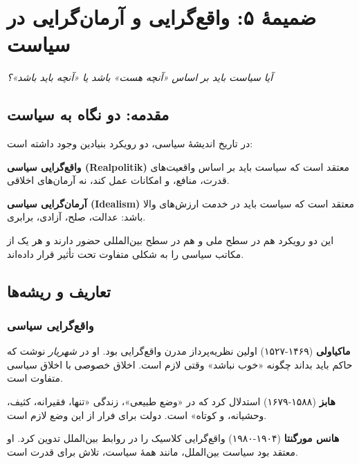 \chapter*{ضمیمهٔ ۵: واقع‌گرایی و آرمان‌گرایی در سیاست}

\begin{tcolorbox}[
    enhanced,
    colback=lightbg,
    colframe=darkgray,
    boxrule=2pt,
    arc=8pt,
    fonttitle=\bfseries\large,
    title={\rl{پرسش محوری}}
]
\begin{center}
\Large\textit{آیا سیاست باید بر اساس «آنچه هست» باشد یا «آنچه باید باشد»؟}
\end{center}
\end{tcolorbox}

\section*{مقدمه: دو نگاه به سیاست}

در تاریخ اندیشهٔ سیاسی، دو رویکرد بنیادین وجود داشته است:

\textbf{واقع‌گرایی سیاسی (Realpolitik)} معتقد است که سیاست باید بر اساس واقعیت‌های قدرت، منافع، و امکانات عمل کند، نه آرمان‌های اخلاقی.

\textbf{آرمان‌گرایی سیاسی (Idealism)} معتقد است که سیاست باید در خدمت ارزش‌های والا باشد: عدالت، صلح، آزادی، برابری.

این دو رویکرد هم در سطح ملی و هم در سطح بین‌المللی حضور دارند و هر یک از مکاتب سیاسی را به شکلی متفاوت تحت تأثیر قرار داده‌اند.

\section{تعاریف و ریشه‌ها}

\subsection{واقع‌گرایی سیاسی}

\textbf{ماکیاولی} (۱۴۶۹-۱۵۲۷) اولین نظریه‌پرداز مدرن واقع‌گرایی بود. او در \textit{شهریار} نوشت که حاکم باید بداند چگونه «خوب نباشد» وقتی لازم است. اخلاق خصوصی با اخلاق سیاسی متفاوت است.

\textbf{هابز} (۱۵۸۸-۱۶۷۹) استدلال کرد که در «وضع طبیعی»، زندگی «تنها، فقیرانه، کثیف، وحشیانه، و کوتاه» است. دولت برای فرار از این وضع لازم است.

\textbf{هانس مورگنتا} (۱۹۰۴-۱۹۸۰) واقع‌گرایی کلاسیک را در روابط بین‌الملل تدوین کرد. او معتقد بود سیاست بین‌الملل، مانند همهٔ سیاست، تلاش برای قدرت است.

